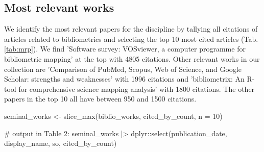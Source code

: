 \subsection{Most relevant works}

We identify the most relevant papers for the discipline by tallying all citations of articles related to bibliometrics and selecting the top 10 most cited articles (Tab.\ref{tab:mrp}).
We find 'Software survey: VOSviewer, a computer programme for bibliometric mapping' at the top with 4805 citations. 
Other relevant works in our collection are 'Comparison of PubMed, Scopus, Web of Science, and Google Scholar: strengths
and weaknesses' with 1996 citations and 'bibliometrix: An R-tool for comprehensive science mapping analysis' with 1800 citations. The other papers in the top 10 all have between 950 and 1500 citations.

\begin{example}
seminal_works <- slice_max(biblio_works, cited_by_count, n = 10)

# output in Table 2:
seminal_works |>
  dplyr::select(publication_date, display_name, so, cited_by_count)  
\end{example}

